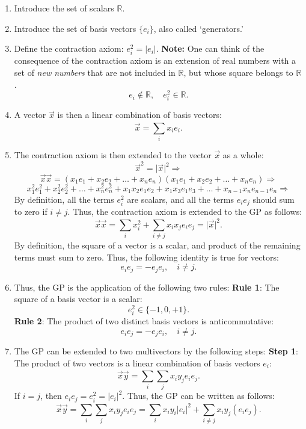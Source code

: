 \documentclass{article}
\begin{document}
\begin{enumerate}
    \item Introduce the set of scalars $\mathbb{R}$.
    \item Introduce the set of basis vectors $\{e_i\}$, also called `generators.'
    \item Define the contraction axiom: $e_i^2 = \vert e_i \vert$. \textbf{Note:} One can think of the consequence of the 
    contraction axiom is an extension of real numbers 
    with a set of \textit{new numbers} that are not included in $\mathbb{R}$, but whose square belongs to $\mathbb{R}$.
    $$e_i \notin \mathbb{R}, \quad e_i^2 \in \mathbb{R}.$$
    \item A vector $\vec{x}$ is then a linear combination of basis vectors:
    $$\vec{x} = \sum_{i}^{} x_i e_i.$$
    \item The contraction axiom is then extended to the vector $\vec{x}$ as a whole:
    $$\vec{x}^2 = \vert \vec{x} \vert^2 \Rightarrow $$
    $$\vec{x}\vec{x} = (x_1 e_1 + x_2 e_2 + \ldots + x_n e_n)(x_1 e_1 + x_2 e_2 + \ldots + x_n e_n) \Rightarrow$$
    $$ x_1^2 e_1^2 + x_2^2 e_2^2 + \ldots + x_n^2 e_n^2 + x_1 x_2 e_1 e_2 + x_1 x_3 e_1 e_3 + \ldots + x_{n-1} x_n e_{n-1} e_n \Rightarrow$$
    By definition, all the terms $e_i^2$ are scalars, and all the terms $e_i e_j$ should sum to zero if $i \neq j$.
    Thus, the contraction axiom is extended to the GP as follows:
    $$\vec{x}\vec{x} = \sum_{i}^{} x_i^2 + \sum_{i \neq j}^{} x_i x_j e_i e_j = \vert \vec{x} \vert^2.$$
    By definition, the square of a vector is a scalar, and product of the remaining terms must sum to zero.
    Thus, the following identity is true for vectors:
    $$e_i e_j = -e_j e_i, \quad i \neq j.$$
    \item Thus, the GP is the application of the following two rules:
    \subitem \textbf{Rule 1}: The square of a basis vector is a scalar:
    $$e_i^2 \in \{-1, 0, +1\}.$$
    \subitem \textbf{Rule 2}: The product of two distinct basis vectors is anticommutative:
    $$e_i e_j = -e_j e_i, \quad i \neq j.$$ 
    \item The GP can be extended to two multivectors by the following steps:
    \subitem \textbf{Step 1}: The product of two vectors is a linear combination of basis vectors $e_i$:
    $$\vec{x}\vec{y} = \sum_{i}^{} \sum_{j}^{} x_i y_j e_i e_j.$$
    If $i = j$, then $e_i e_j = e_i^2 = \vert e_i \vert^2$. 
    Thus, the GP can be written as follows:
    $$\vec{x}\vec{y} = \sum_{i}^{} \sum_{j}^{} x_i y_j e_i e_j = \sum_{i}^{} x_i y_i \vert e_i \vert^2 + \sum_{i \neq j}^{} x_i y_j (e_i e_j).$$

\end{enumerate}
\end{document}
